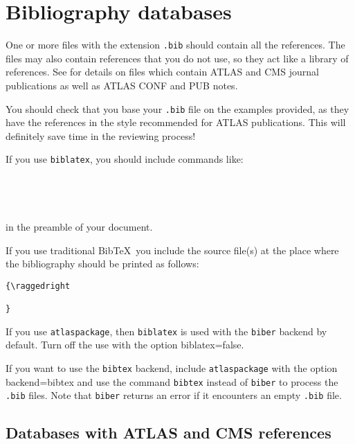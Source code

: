 \documentclass[UKenglish, texlive=2016]{\ATLASLATEXPATH atlasdoc}
\newcommand*{\BibTeX}{Bib\TeX}
\newcommand{\File}[1]{\texttt{#1}\xspace}
\newcommand{\Option}[1]{\textsf{#1}\xspace}
\newcommand{\Package}[1]{\texttt{#1}\xspace}
\begin{document}
\section{Bibliography databases}

One or more files with the extension \texttt{.bib} should contain all the references.
The files may also contain references that you do not use, so they act like a library of references.
See \Sect{\ref{sec:atlascmsrefs}} for details on files which contain ATLAS and CMS journal publications
as well as ATLAS CONF and PUB notes.

You should check that you base your \File{.bib} file on the examples provided,
as they have the references in the style recommended for ATLAS publications.
This will definitely save time in the reviewing process!

If you use \Package{biblatex}, you should include commands like:
%
\begin{verbatim}
  
  
  
\end{verbatim}
%
in the preamble of your document.

If you use traditional \BibTeX\ you include the source file(s) at the place where the bibliography should be printed as follows:
%
\begin{verbatim}
{\raggedright
  
}
\end{verbatim}

If you use \Package{atlaspackage}, then \Package{biblatex} is used with the \texttt{biber} backend by default.
Turn off the use with the option \Option{biblatex=false}.

If you want to use the \Package{bibtex} backend,
include \Package{atlaspackage} with the option \Option{backend=bibtex} and
use the command \texttt{bibtex} instead of \texttt{biber} to process the \texttt{.bib} files.
Note that \texttt{biber} returns an error if it encounters an empty \texttt{.bib} file.


\subsection{Databases with ATLAS and CMS references}
\label{sec:atlascmsrefs}
\end{document}
